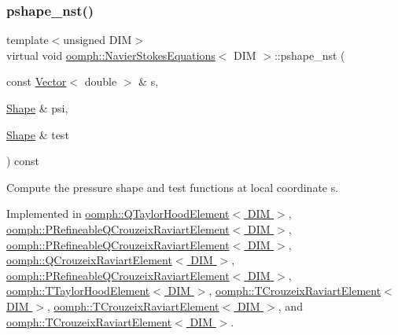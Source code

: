 \subsubsection{\texorpdfstring{pshape\+\_\+nst()}{pshape\_nst()}\hspace{0.1cm}{\footnotesize\ttfamily [2/2]}}
{\footnotesize\ttfamily template$<$unsigned D\+IM$>$ \\
virtual void \hyperlink{classoomph_1_1NavierStokesEquations}{oomph\+::\+Navier\+Stokes\+Equations}$<$ D\+IM $>$\+::pshape\+\_\+nst (\begin{DoxyParamCaption}\item[{const \hyperlink{classoomph_1_1Vector}{Vector}$<$ double $>$ \&}]{s,  }\item[{\hyperlink{classoomph_1_1Shape}{Shape} \&}]{psi,  }\item[{\hyperlink{classoomph_1_1Shape}{Shape} \&}]{test }\end{DoxyParamCaption}) const\hspace{0.3cm}{\ttfamily [pure virtual]}}



Compute the pressure shape and test functions at local coordinate s. 



Implemented in \hyperlink{classoomph_1_1QTaylorHoodElement_a63b1c65111efb6bea78245b897516c71}{oomph\+::\+Q\+Taylor\+Hood\+Element$<$ D\+I\+M $>$}, \hyperlink{classoomph_1_1PRefineableQCrouzeixRaviartElement_acf1d5e8b3dc66e12bff22d73d06ea4d6}{oomph\+::\+P\+Refineable\+Q\+Crouzeix\+Raviart\+Element$<$ D\+I\+M $>$}, \hyperlink{classoomph_1_1PRefineableQCrouzeixRaviartElement_aa3cf8c270ec40c6d7c507b71dd6676d3}{oomph\+::\+P\+Refineable\+Q\+Crouzeix\+Raviart\+Element$<$ D\+I\+M $>$}, \hyperlink{classoomph_1_1QCrouzeixRaviartElement_a662b9593c9ca0b4589d5498812f1fb91}{oomph\+::\+Q\+Crouzeix\+Raviart\+Element$<$ D\+I\+M $>$}, \hyperlink{classoomph_1_1PRefineableQCrouzeixRaviartElement_a5891e3675a411f77fca204fa567c71da}{oomph\+::\+P\+Refineable\+Q\+Crouzeix\+Raviart\+Element$<$ D\+I\+M $>$}, \hyperlink{classoomph_1_1TTaylorHoodElement_a73ffecb519bf03336ea6cfe2eb7567df}{oomph\+::\+T\+Taylor\+Hood\+Element$<$ D\+I\+M $>$}, \hyperlink{classoomph_1_1TCrouzeixRaviartElement_a0d100edb0d0d192db74418881765fa73}{oomph\+::\+T\+Crouzeix\+Raviart\+Element$<$ D\+I\+M $>$}, \hyperlink{classoomph_1_1TCrouzeixRaviartElement_aaf075113ef6d32642ec9d482a961ebdc}{oomph\+::\+T\+Crouzeix\+Raviart\+Element$<$ D\+I\+M $>$}, and \hyperlink{classoomph_1_1TCrouzeixRaviartElement_ae9eed6d89a009cced2b3ab8838215cdf}{oomph\+::\+T\+Crouzeix\+Raviart\+Element$<$ D\+I\+M $>$}.

